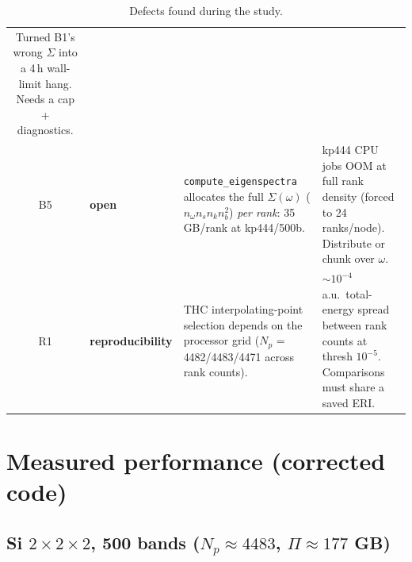 \documentclass[11pt]{article}
\newcommand{\statusopen}{\textcolor{bad}{\textbf{open}}}
\begin{document}
\begin{table}[H]
\begin{tabularx}{\textwidth}{@{}clXX@{}}
Turned B1's wrong $\Sigma$ into a 4\,h wall-limit hang. Needs a cap + diagnostics. \\
B5 & \statusopen{} &
\texttt{compute\_eigenspectra} allocates the full $\Sigma(\omega)$
($n_\omega n_s n_k n_b^2$) \emph{per rank}: 35\,GB/rank at kp444/500b. &
kp444 CPU jobs OOM at full rank density (forced to 24 ranks/node). Distribute or chunk
over $\omega$. \\
R1 & \textcolor{cpuc}{\textbf{reproducibility}} &
THC interpolating-point selection depends on the processor grid ($N_p$ = 4482/4483/4471
across rank counts). &
$\sim$$10^{-4}$\,a.u.\ total-energy spread between rank counts at thresh $10^{-5}$.
Comparisons must share a saved ERI. \\
\bottomrule
\end{tabularx}
\caption{Defects found during the study.}
\end{table}

\section{Measured performance (corrected code)}
\subsection{Si $2{\times}2{\times}2$, 500 bands ($N_p{\approx}4483$, $\Pi\approx 177$ GB)}
\end{document}
